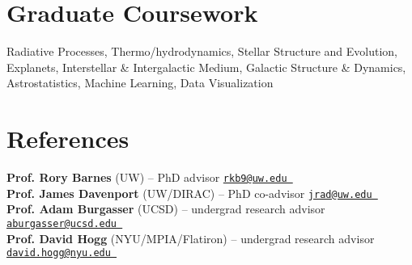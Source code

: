 \documentclass[a4,11pt]{article}
\let\orighref\href
\renewcommand{\href}[2]{\orighref{#1}{#2\,\scriptsize\faExternalLink}}
\begin{document}

\section{Graduate Coursework}

Radiative Processes, Thermo/hydrodynamics, Stellar Structure and Evolution, Explanets, Interstellar \& Intergalactic Medium, Galactic Structure \& Dynamics, Astrostatistics, Machine Learning, Data Visualization

\section{References}

\textbf{Prof. Rory Barnes} (UW) -- PhD advisor \hfill {\tt \href{rkb9@uw.edu}{rkb9@uw.edu}} \\
\textbf{Prof. James Davenport} (UW/DIRAC) -- PhD co-advisor \hfill {\tt \href{jrad@uw.edu}{jrad@uw.edu}} \\
\textbf{Prof. Adam Burgasser} (UCSD) -- undergrad research advisor \hfill {\tt \href{aburgasser@ucsd.edu}{aburgasser@ucsd.edu}}   \\
\textbf{Prof. David Hogg} (NYU/MPIA/Flatiron) -- undergrad research advisor \hfill {\tt \href{david.hogg@nyu.edu}{david.hogg@nyu.edu}}  \\


\end{document}
